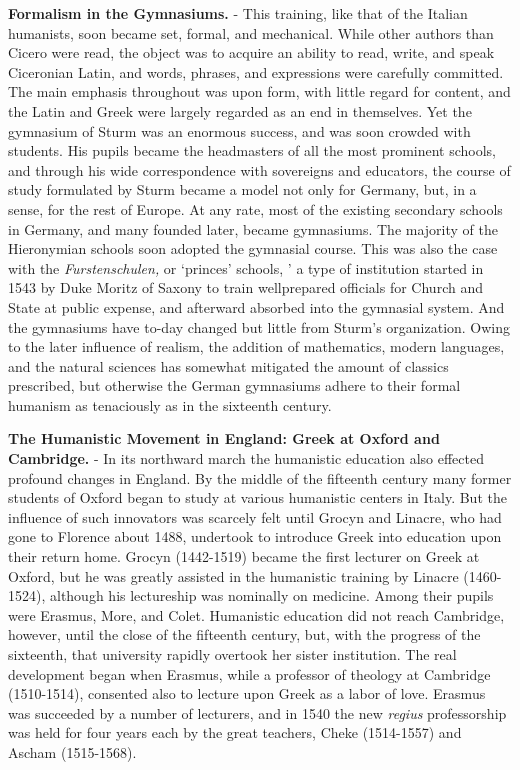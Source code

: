\documentclass[]{book}
\begin{document}
\textbf{Formalism in the Gymnasiums.} - This training, like that of the Italian humanists, soon became set, formal, and mechanical. While other authors than Cicero were read, the object was to acquire an ability to read, write, and speak Ciceronian Latin, and words, phrases, and expressions were carefully committed. The main emphasis throughout was upon form, with little regard for content, and the Latin and Greek were largely regarded as an end in themselves. Yet the gymnasium of Sturm was an enormous success, and was soon crowded with students. His pupils became the headmasters of all the most prominent schools, and through his wide correspondence with sovereigns and educators, the course of study formulated by Sturm became a model not only for Germany, but, in a sense, for the rest of Europe. At any rate, most of the existing secondary schools in Germany, and many founded later, became gymnasiums. The majority of the Hieronymian schools soon adopted the gymnasial course. This was also the case with the \emph{Furstenschulen,} or `princes' schools, ' a type of institution started in 1543 by Duke Moritz of Saxony to train wellprepared officials for Church and State at public expense, and afterward absorbed into the gymnasial system. And the gymnasiums have to-day changed but little from Sturm's organization. Owing to the later influence of realism, the addition of mathematics, modern languages, and the natural sciences has somewhat mitigated the amount of classics prescribed, but otherwise the German gymnasiums adhere to their formal humanism as tenaciously as in the sixteenth century.

\textbf{The Humanistic Movement in England: Greek at Oxford and Cambridge.} - In its northward march the humanistic education also effected profound changes in England. By the middle of the fifteenth century many former students of Oxford began to study at various humanistic centers in Italy. But the influence of such innovators was scarcely felt until Grocyn and Linacre, who had gone to Florence about 1488, undertook to introduce Greek into education upon their return home. Grocyn (1442-1519) became the first lecturer on Greek at Oxford, but he was greatly assisted in the humanistic training by Linacre (1460-1524), although his lectureship was nominally on medicine. Among their pupils were Erasmus, More, and Colet. Humanistic education did not reach Cambridge, however, until the close of the fifteenth century, but, with the progress of the sixteenth, that university rapidly overtook her sister institution. The real development began when Erasmus, while a professor of theology at Cambridge (1510-1514), consented also to lecture upon Greek as a labor of love. Erasmus was succeeded by a number of lecturers, and in 1540 the new \emph{regius} professorship was held for four years each by the great teachers, Cheke (1514-1557) and Ascham (1515-1568).
\end{document}

